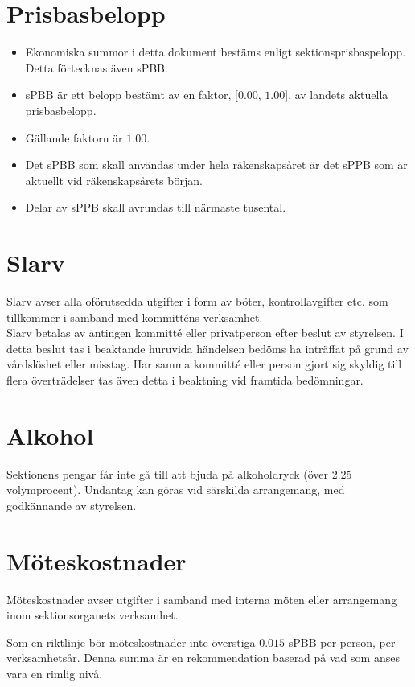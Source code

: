 \documentclass[11pt, includeaddress]{classes/cthit}
\begin{document}
\section{Prisbasbelopp}
    \begin{itemize}
        \item Ekonomiska summor i detta dokument bestäms enligt sektionsprisbaspelopp. Detta förtecknas även sPBB.
        \item sPBB är ett belopp bestämt av en faktor, [$0.00$, $1.00$], av landets aktuella prisbasbelopp.
        \item Gällande faktorn är $1.00$.
        \item Det sPBB som skall användas under hela räkenskapsåret är det sPPB som är aktuellt vid räkenskapsårets början.
        \item Delar av sPPB skall avrundas till närmaste tusental.
    \end{itemize}

\section{Slarv}
Slarv avser alla oförutsedda utgifter i form av böter, kontrollavgifter etc. som tillkommer i samband med kommitténs verksamhet. \\
Slarv betalas av antingen kommitté eller privatperson efter beslut av styrelsen. I detta beslut tas i beaktande huruvida händelsen bedöms ha inträffat på grund av vårdslöshet eller misstag. Har samma kommitté eller person gjort sig skyldig till flera överträdelser tas även detta i beaktning vid framtida bedömningar.

\section{Alkohol}
Sektionens pengar får inte gå till att bjuda på alkoholdryck (över 2.25 volymprocent). Undantag kan göras vid särskilda arrangemang, med godkännande av styrelsen.

\section{Möteskostnader}
Möteskostnader avser utgifter i samband med interna möten eller arrangemang inom sektionsorganets verksamhet.

Som en riktlinje bör möteskostnader inte överstiga $0.015$ sPBB per person, per verksamhetsår. Denna summa är en rekommendation baserad på vad som anses vara en rimlig nivå.
\end{document}
